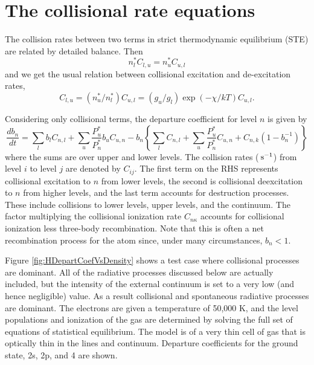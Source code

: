 \section{The collisional rate equations}

The collision rates between two terms in strict
thermodynamic equilibrium (STE) are related by detailed
balance.  Then
\begin{equation}
n_l^*{C_{l,u}} = n_u^*{C_{u,l}}
\end{equation}
and we get the usual relation between collisional excitation and
de-excitation rates,
\begin{equation}
{C_{l,u}} = \left( {n_u^*/n_l^*} \right){C_{u,l}} = \left( {{g_u}/{g_l}}
\right)\exp \left( { - \chi /kT} \right){C_{u,l}}.
\end{equation}

Considering only collisional terms, the departure coefficient for level
$n$ is given by
\begin{equation}
\frac{{d{b_n}}}{{dt}} = \sum\limits_l {{b_l}{C_{n,l}} + \sum\limits_u
{\frac{{P_u^*}}{{P_n^*}}{b_u}{C_{u,n}} - {b_n}\left\{ {\sum\limits_l
{{C_{n,l}}}  + \sum\limits_u {\frac{{P_u^*}}{{P_n^*}}{C_{u,n}} +
{C_{n,k}}\left( {1 - b_n^{ - 1}} \right)} } \right\}} }
\end{equation}
where the sums are over upper and lower levels.
The collision rates
(${\rm\thinspace s^{-1}}$)
from level $i$ to level $j$ are denoted by $C_{ij}$.
The first term on the RHS
represents collisional excitation to $n$ from lower levels, the second is
collisional deexcitation to $n$ from higher levels,
and the last term accounts
for destruction processes.
These include collisions to lower levels, upper
levels, and the continuum.
The factor multiplying the collisional ionization
rate $C_{n\kappa}$ accounts for collisional ionization less three-body recombination.
Note that this is often a net recombination process for the atom since,
under many circumstances, $b_n < 1$.

Figure \ref{fig:HDepartCoefVsDensity} shows a test case where collisional processes are dominant.
All of the radiative processes discussed below are actually included, but
the intensity of the external continuum is set to a very low (and hence
negligible) value.  As a result collisional and spontaneous radiative
processes are dominant.  The electrons are given a temperature of 50,000
K, and the level populations and ionization of the gas are determined by
solving the full set of equations of statistical equilibrium.  The model
is of a very thin cell of gas that is optically thin in the lines and
continuum.  Departure coefficients for the ground state, 2s, 2p, and 4 are
shown.

